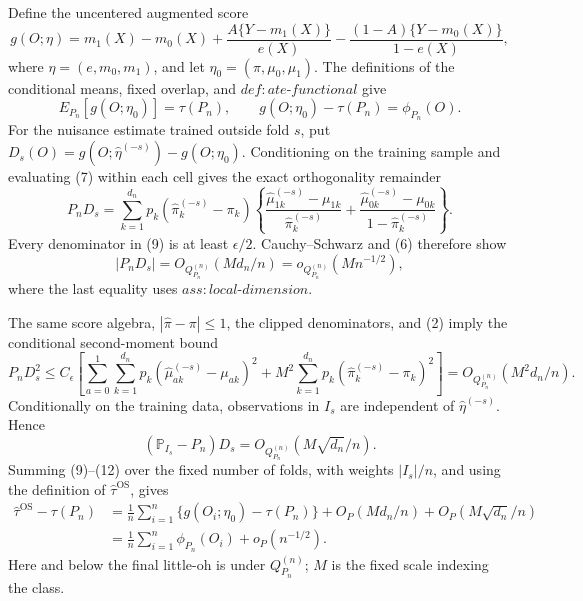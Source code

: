 Define the uncentered augmented score
\[
 g(O;\eta)=m_1(X)-m_0(X)
 +\frac{A\{Y-m_1(X)\}}{e(X)}
 -\frac{(1-A)\{Y-m_0(X)\}}{1-e(X)},
\tag{7}
\]
where \(\eta=(e,m_0,m_1)\), and let
\(\eta_0=(\pi,\mu_0,\mu_1)\).  The definitions of the conditional means,
fixed overlap, and \(def:ate\text{-}functional\) give
\[
 E_{P_n}[g(O;\eta_0)]=\tau(P_n),
 \qquad g(O;\eta_0)-\tau(P_n)=\phi_{P_n}(O).
\tag{8}
\]
For the nuisance estimate trained outside fold \(s\), put
\(D_s(O)=g(O;\widehat\eta^{(-s)})-g(O;\eta_0)\).  Conditioning on the
training sample and evaluating (7) within each cell gives the exact
orthogonality remainder
\[
 P_nD_s=\sum_{k=1}^{d_n}p_k
 (\widehat\pi_k^{(-s)}-\pi_k)
 \left\{
 \frac{\widehat\mu_{1k}^{(-s)}-\mu_{1k}}
      {\widehat\pi_k^{(-s)}}
 +\frac{\widehat\mu_{0k}^{(-s)}-\mu_{0k}}
      {1-\widehat\pi_k^{(-s)}}
 \right\}.
\tag{9}
\]
Every denominator in (9) is at least \(\epsilon/2\).  Cauchy--Schwarz and
(6) therefore show
\[
 |P_nD_s|=O_{Q_{P_n}^{(n)}}(Md_n/n)
          =o_{Q_{P_n}^{(n)}}(Mn^{-1/2}),
\tag{10}
\]
where the last equality uses \(ass:local\text{-}dimension\).

The same score algebra, \(|\widehat\pi-\pi|\le1\), the clipped denominators,
and (2) imply the conditional second-moment bound
\[
 P_nD_s^2\le C_\epsilon\left[
 \sum_{a=0}^1\sum_{k=1}^{d_n}p_k
 (\widehat\mu_{ak}^{(-s)}-\mu_{ak})^2
 +M^2\sum_{k=1}^{d_n}p_k
 (\widehat\pi_k^{(-s)}-\pi_k)^2\right]
 =O_{Q_{P_n}^{(n)}}(M^2d_n/n).
\tag{11}
\]
Conditionally on the training data, observations in \(I_s\) are independent
of \(\widehat\eta^{(-s)}\).  Hence
\[
 (\mathbb P_{I_s}-P_n)D_s
 =O_{Q_{P_n}^{(n)}}(M\sqrt{d_n}/n).
\tag{12}
\]
Summing (9)--(12) over the fixed number of folds, with weights
\(|I_s|/n\), and using the definition of \(\widehat\tau^{\mathrm{OS}}\), gives
\[
\begin{aligned}
 \widehat\tau^{\mathrm{OS}}-\tau(P_n)
 &=\frac1n\sum_{i=1}^n\{g(O_i;\eta_0)-\tau(P_n)\}
   +O_P(Md_n/n)+O_P(M\sqrt{d_n}/n)\\
 &=\frac1n\sum_{i=1}^n\phi_{P_n}(O_i)
   +o_P(n^{-1/2}).
\end{aligned}
\tag{13}
\]
Here and below the final little-oh is under \(Q_{P_n}^{(n)}\); \(M\) is the
fixed scale indexing the class.

